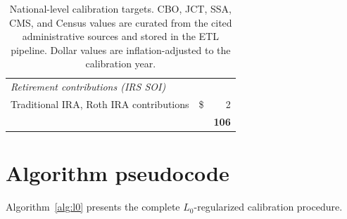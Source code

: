 \begin{table}[H]
{\begin{tabular}{p{}lr}
\midrule
\multicolumn{3}{l}{\textit{Retirement contributions (IRS SOI)}} \\
Traditional IRA, Roth IRA contributions & \$ & 2 \\
\midrule
& & \textbf{106} \\
\bottomrule
\end{tabular}
}
\caption{National-level calibration targets. CBO, JCT, SSA, CMS, and Census values are curated from
the cited administrative sources and stored in the ETL pipeline. Dollar values are
inflation-adjusted to the calibration year.}
\label{tab:national_targets}
\end{table}

\section{Algorithm pseudocode}
\label{app:algorithm}

Algorithm~\ref{alg:l0} presents the complete $L_0$-regularized calibration procedure.

